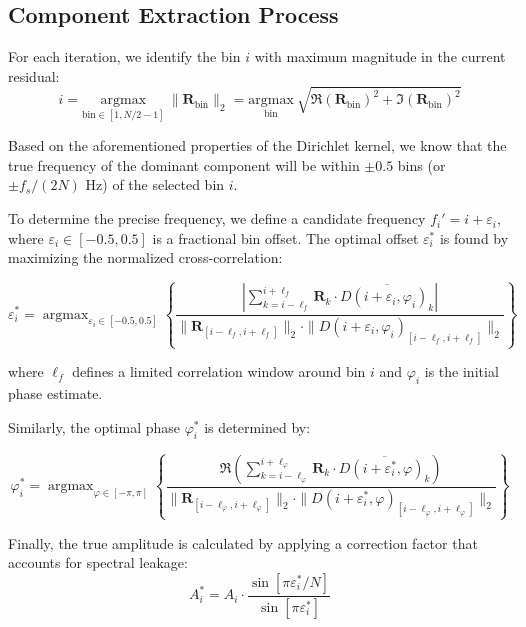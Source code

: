\documentclass[11pt,twoside]{report}
\DeclareMathOperator*{\argmax}{argmax}
\numberwithin{thm}{section}
\numberwithin{equation}{section}
\DeclareMathOperator*{\argmax}{arg\,max}
\begin{document}
\subsection{Component Extraction Process}

For each iteration, we identify the bin $i$ with maximum magnitude in the current residual:
\begin{equation}
\label{eq:peak_bin}
i = \underset{\text{bin} \in [1, N/2-1]}{\mathrm{argmax}}\ \|\mathbf{R}_{\text{bin}}\|_2 = \underset{\text{bin}}{\mathrm{argmax}}\ \sqrt{\Re(\mathbf{R}_{\text{bin}})^2 + \Im(\mathbf{R}_{\text{bin}})^2}
\end{equation}

Based on the aforementioned properties of the Dirichlet kernel, we know that the true frequency of the dominant component will be within $\pm 0.5$ bins (or $\pm f_s/(2N)$ Hz) of the selected bin $i$.

To determine the precise frequency, we define a candidate frequency $f_i' = i + \varepsilon_i$, where $\varepsilon_i \in [-0.5, 0.5]$ is a fractional bin offset. The optimal offset $\varepsilon_i^*$ is found by maximizing the normalized cross-correlation:

\begin{equation}
\label{eq:optimal_freq}
\varepsilon_i^* = \argmax_{\varepsilon_i \in [-0.5, 0.5]} \left\{ \frac{\left|\sum_{k=i-\ell_f}^{i+\ell_f} \mathbf{R}_k \cdot \overline{D(i + \varepsilon_i, \varphi_i)_k}\right|}{\|\mathbf{R}_{[i-\ell_f, i+\ell_f]}\|_2 \cdot \|D(i + \varepsilon_i, \varphi_i)_{[i-\ell_f, i+\ell_f]}\|_2} \right\}
\end{equation}

where $\ell_f$ defines a limited correlation window around bin $i$ and $\varphi_i$ is the initial phase estimate.

Similarly, the optimal phase $\varphi_i^*$ is determined by:

\begin{equation}
\label{eq:optimal_phase}
\varphi_i^* = \argmax_{\varphi \in [-\pi, \pi]} \left\{ \frac{\Re\left(\sum_{k=i-\ell_\varphi}^{i+\ell_\varphi} \mathbf{R}_k \cdot \overline{D(i + \varepsilon_i^*, \varphi)_k}\right)}{\|\mathbf{R}_{[i-\ell_\varphi, i+\ell_\varphi]}\|_2 \cdot \|D(i + \varepsilon_i^*, \varphi)_{[i-\ell_\varphi, i+\ell_\varphi]}\|_2} \right\}
\end{equation}

Finally, the true amplitude is calculated by applying a correction factor that accounts for spectral leakage:
\begin{equation}
\label{eq:amplitude_correction}
A_i^* = A_i \cdot \frac{\sin[\pi \varepsilon_i^*/N]}{\sin[\pi \varepsilon_i^*]}
\end{equation}
\end{document}
